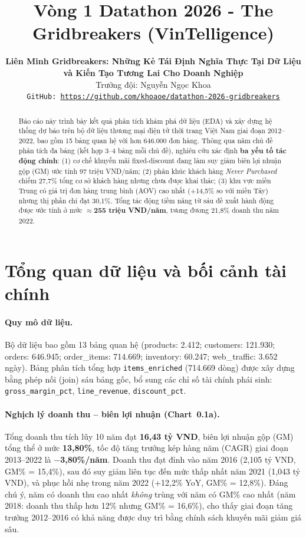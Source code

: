 \documentclass{article}
\title{%
  Vòng 1 Datathon 2026 - The Gridbreakers (VinTelligence)
}
\author{%
  \textbf{Liên Minh Gridbreakers: Những Kẻ Tái Định Nghĩa Thực Tại Dữ Liệu}\\
  \textbf{và Kiến Tạo Tương Lai Cho Doanh Nghiệp}\\
  Trưởng đội: Nguyễn Ngọc Khoa\\
  \texttt{GitHub: \url{https://github.com/khoaoe/datathon-2026-gridbreakers}}
}
\begin{document}
\maketitle

\begin{abstract}
Báo cáo này trình bày kết quả phân tích khám phá dữ liệu (EDA) và xây dựng hệ thống dự báo trên bộ dữ liệu thương mại điện tử thời trang Việt Nam giai đoạn 2012--2022, bao gồm 15 bảng quan hệ với hơn 646.000 đơn hàng. Thông qua năm chủ đề phân tích đa bảng (kết hợp 3--4 bảng mỗi chủ đề), nghiên cứu xác định \textbf{ba yếu tố tác động chính}: (1) cơ chế khuyến mãi fixed-discount đang làm suy giảm biên lợi nhuận gộp (GM) ước tính 97 triệu VND/năm; (2) phân khúc khách hàng \textit{Never Purchased} chiếm 27,7\% tổng cơ sở khách hàng nhưng chưa được khai thác; (3) khu vực miền Trung có giá trị đơn hàng trung bình (AOV) cao nhất (+14,5\% so với miền Tây) nhưng thị phần chỉ đạt 30,1\%. Tổng tác động tiềm năng từ sáu đề xuất hành động được ước tính ở mức \textbf{$\approx$255 triệu VND/năm}, tương đương 21,8\% doanh thu năm 2022.
\end{abstract}

\section{Tổng quan dữ liệu và bối cảnh tài chính}
\label{sec:overview}

\paragraph{Quy mô dữ liệu.}
Bộ dữ liệu bao gồm 13 bảng quan hệ (products: 2.412; customers: 121.930; orders: 646.945; order\_items: 714.669; inventory: 60.247; web\_traffic: 3.652 ngày). Bảng phân tích tổng hợp \texttt{items\_enriched} (714.669 dòng) được xây dựng bằng phép nối (join) sáu bảng gốc, bổ sung các chỉ số tài chính phái sinh: \texttt{gross\_margin\_pct}, \texttt{line\_revenue}, \texttt{discount\_pct}.

\paragraph{Nghịch lý doanh thu -- biên lợi nhuận (Chart~0.1a).}
Tổng doanh thu tích lũy 10 năm đạt \textbf{16,43 tỷ VND}, biên lợi nhuận gộp (GM) tổng thể ở mức \textbf{13,80\%}, tốc độ tăng trưởng kép hàng năm (CAGR) giai đoạn 2013--2022 là \textbf{$-$3,80\%/năm}. Doanh thu đạt đỉnh vào năm 2016 (2,105 tỷ VND, GM\% = 15,4\%), sau đó suy giảm liên tục đến mức thấp nhất năm 2021 (1,043 tỷ VND), và phục hồi nhẹ trong năm 2022 (+12,2\% YoY, GM\% = 12,8\%). Đáng chú ý, năm có doanh thu cao nhất \textit{không} trùng với năm có GM\% cao nhất (năm 2018: doanh thu thấp hơn 12\% nhưng GM\% = 16,6\%), cho thấy giai đoạn tăng trưởng 2012--2016 có khả năng được duy trì bằng chính sách khuyến mãi giảm giá sâu.
\end{document}
